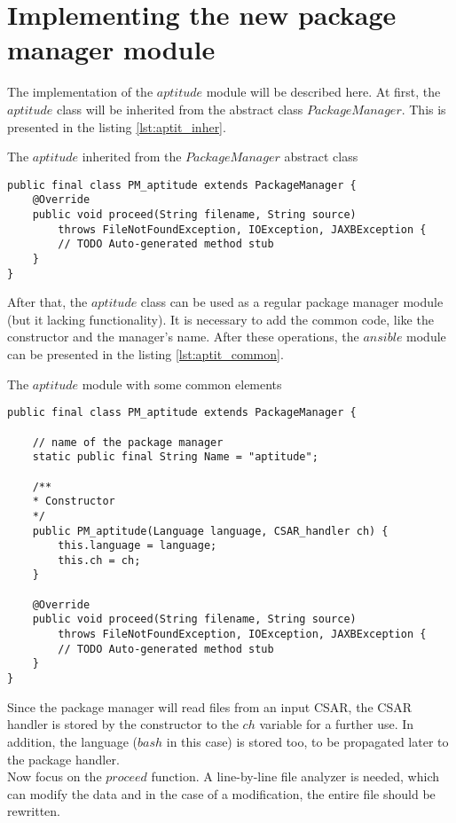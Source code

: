 \section{Implementing the new package manager module}\label{sec:aptitude_imp}
The implementation of the $aptitude$ module will be described here.
At first, the $aptitude$ class will be inherited from the abstract class $PackageManager$. 
This is presented in the listing \ref{lst:aptit_inher}.\\
\begin{Listing} 
\caption{The $aptitude$ inherited from the $PackageManager$ abstract class}
\label{lst:aptit_inher}
\begin{lstlisting}
public final class PM_aptitude extends PackageManager {
	@Override
	public void proceed(String filename, String source)
		throws FileNotFoundException, IOException, JAXBException {
		// TODO Auto-generated method stub
	}
}
\end{lstlisting}
\end{Listing} 
After that, the $aptitude$ class can be used as a regular package manager module (but it lacking functionality).
It is necessary to add the common code, like the constructor and the manager's name.
After these operations, the $ansible$ module can be presented in the listing \ref{lst:aptit_common}.\\
\begin{Listing} 
\caption{The $aptitude$ module with some common elements}
\label{lst:aptit_common}
\begin{lstlisting}
public final class PM_aptitude extends PackageManager {

	// name of the package manager
	static public final String Name = "aptitude";
	
	/**
	* Constructor
	*/
	public PM_aptitude(Language language, CSAR_handler ch) {
		this.language = language;
		this.ch = ch;
	}
	
	@Override
	public void proceed(String filename, String source)
		throws FileNotFoundException, IOException, JAXBException {
		// TODO Auto-generated method stub
	}
}
\end{lstlisting}
\end{Listing} 
Since the package manager will read files from an input CSAR, the CSAR handler is stored by the constructor to the $ch$ variable for a further use.
In addition, the language ($bash$ in this case) is stored too, to be propagated later to the package handler.\\
Now focus on the $proceed$ function.
A line-by-line file analyzer is needed, which can modify the data and in the case of a modification, the entire file should be rewritten.

